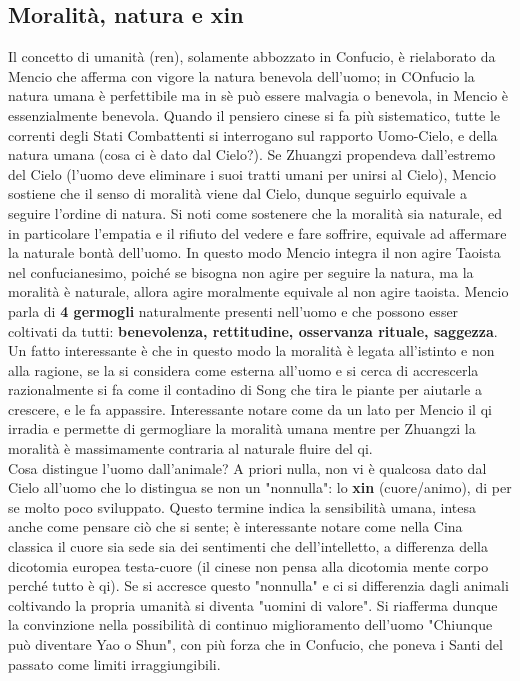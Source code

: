 \documentclass[10pt,a4paper]{report}
\begin{document}
\subsection{Moralità, natura e xin}
Il concetto di umanità (ren), solamente abbozzato in Confucio, è rielaborato da Mencio che afferma con vigore la natura benevola dell'uomo; in COnfucio la natura umana è perfettibile ma in sè può essere malvagia o benevola, in Mencio è essenzialmente benevola. Quando il pensiero cinese si fa più sistematico, tutte le correnti degli Stati Combattenti si interrogano sul rapporto Uomo-Cielo, e della natura umana (cosa ci è dato dal Cielo?). Se Zhuangzi propendeva dall'estremo del Cielo (l'uomo deve eliminare i suoi tratti umani per unirsi al Cielo), Mencio sostiene che il senso di moralità viene dal Cielo, dunque seguirlo equivale a seguire l'ordine di natura. Si noti come sostenere che la moralità sia naturale, ed in particolare l'empatia e il rifiuto del vedere e fare soffrire, equivale ad affermare la naturale bontà dell'uomo. In questo modo Mencio integra il non agire Taoista nel confucianesimo, poiché se bisogna non agire per seguire la natura, ma la moralità è naturale, allora agire moralmente equivale al non agire taoista. Mencio parla di \textbf{4 germogli} naturalmente presenti nell'uomo e che possono esser coltivati da tutti:\textbf{ benevolenza, rettitudine, osservanza rituale, saggezza}. Un fatto interessante è che in questo modo la moralità è legata all'istinto e non alla ragione, se la si considera come esterna all'uomo e si cerca di accrescerla razionalmente si fa come il contadino di Song che tira le piante per aiutarle a crescere, e le fa appassire. Interessante notare come da un lato per Mencio il qi irradia e permette di germogliare la moralità umana mentre per Zhuangzi la moralità è massimamente contraria al naturale fluire del qi.\\
Cosa distingue l'uomo dall'animale? A priori nulla, non vi è qualcosa dato dal Cielo all'uomo che lo distingua se non un "nonnulla": lo \textbf{xin} (cuore/animo), di per se molto poco sviluppato. Questo termine indica la sensibilità umana, intesa anche come pensare ciò che si sente; è interessante notare come nella Cina classica il cuore sia sede sia dei sentimenti che dell'intelletto, a differenza della dicotomia europea testa-cuore (il cinese non pensa alla dicotomia mente corpo perché tutto è qi). Se si accresce questo "nonnulla" e ci si differenzia dagli animali coltivando la propria umanità si diventa "uomini di valore". Si riafferma dunque la convinzione nella possibilità di continuo miglioramento dell'uomo "Chiunque può diventare Yao o Shun", con più forza che in Confucio, che poneva i Santi del passato come limiti irraggiungibili.\\
\end{document}
